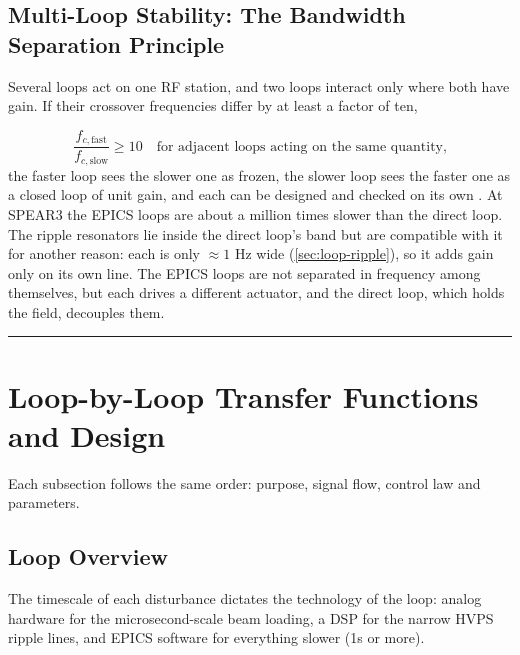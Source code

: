 \subsection{Multi-Loop Stability: The Bandwidth Separation Principle}\label{sec:arch-multiloop}


Several loops act on one RF station, and two loops interact only where both have gain. If their crossover frequencies differ by at least a factor of ten,

\begin{equation}\label{eq:bw-sep}
\frac{f_{c,\text{fast}}}{f_{c,\text{slow}}} \geq 10 \quad \text{for adjacent loops acting on the same quantity,}
\end{equation}
the faster loop sees the slower one as frozen, the slower loop sees the faster one as a closed loop of unit gain, and each can be designed and checked on its own . At SPEAR3 the EPICS loops are about a million times slower than the direct loop. The ripple resonators lie inside the direct loop's band but are compatible with it for another reason: each is only \(\approx 1\) Hz wide (\cref{sec:loop-ripple}), so it adds gain only on its own line. The EPICS loops are not separated in frequency among themselves, but each drives a different actuator, and the direct loop, which holds the field, decouples them.

\begin{center}\rule{0.5\linewidth}{0.5pt}\end{center}

\section{Loop-by-Loop Transfer Functions and Design}\label{sec:loops}


Each subsection follows the same order: purpose, signal flow, control law and parameters.

\subsection{Loop Overview}\label{sec:loop-overview}


The timescale of each disturbance dictates the technology of the loop: analog hardware for the microsecond-scale beam loading, a DSP for the narrow HVPS ripple lines, and EPICS software for everything slower (1s or more).

